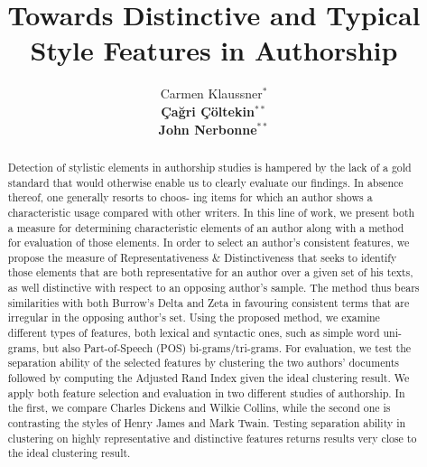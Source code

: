 \documentclass[a4paper,10pt,twoside,fleqn]{article}
\begin{document}
\title{Towards Distinctive and Typical Style Features in Authorship}


\author{Carmen Klaussner$^*$ \\
{\normalsize \bf \c{C}a\u{g}ri \c{C}öltekin}$^{**}$ \\
{\normalsize \bf John Nerbonne}$^{**}$ 
\AND {}
\AND {} }


\maketitle\thispagestyle{empty} %


\begin{abstract}
Detection of stylistic elements in authorship studies is hampered by
the lack of a gold standard that would otherwise enable us to clearly
evaluate our findings. In absence thereof, one generally resorts to choos-
ing items for which an author shows a characteristic usage compared
with other writers. In this line of work, we present both a measure for
determining characteristic elements of an author along with a method
for evaluation of those elements.
In order to select an author’s consistent features, we propose the
measure of Representativeness \& Distinctiveness \cite{prokic2012detecting} that
seeks to identify those elements that are both representative for an author
over a given set of his texts, as well distinctive with respect to an opposing
author’s sample. The method thus bears similarities with both Burrow’s
Delta  and Zeta in favouring consistent
terms that are irregular in the opposing author’s set.
Using the proposed method, we examine different types of features,
both lexical and syntactic ones, such as simple word uni-grams, but also
Part-of-Speech (POS) bi-grams/tri-grams. For evaluation, we test the
separation ability of the selected features by clustering the two authors’
documents followed by computing the Adjusted Rand Index \cite{hubert1985comparing} 
given the ideal clustering result.
We apply both feature selection and evaluation in two different
studies of authorship. In the first, we compare Charles Dickens and
Wilkie Collins, while the second one is contrasting the styles of Henry
James and Mark Twain. Testing separation ability in clustering on highly
representative and distinctive features returns results very close to the
ideal clustering result.
\end{abstract}
\end{document}
